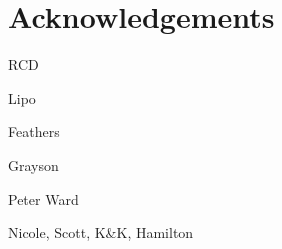 





\renewcommand{\cftchapterfont}{\normalsize\normalfont}   
\renewcommand{\cftpartfont}{\normalsize\normalfont}   
\renewcommand{\cftsectionfont}{\normalsize\normalfont} 
\renewcommand{\cftsubsectionfont}{\normalsize\normalfont} 
\renewcommand*{\cftpartname}{Part\space}
\newpage
\setcounter{tocdepth}{3} 
\tableofcontents*
\cleardoublepage
\listoffigures
\cleardoublepage
\listoftables
\cleardoublepage




\chapter{Acknowledgements}

RCD

Lipo

Feathers

Grayson

Peter Ward

Nicole, Scott, K\&K, Hamilton








% 



\newpage
%